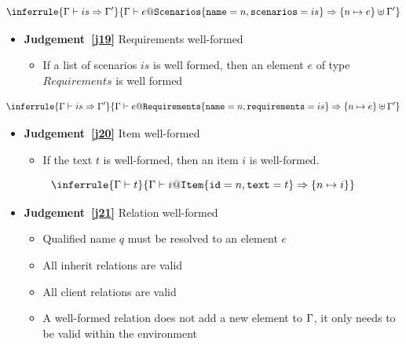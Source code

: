 \documentclass{article}
\begin{document}
\begin{equation}
\label{j18}
\inferrule{
  \wb{\env}{is}{\env'}
}
{
  \wb{\env}{e@\lab{Scenarios}\{\lab{name}=n,\lab{scenarios}=is\}}{\{n\mapsto e\} \uplus \env'}
}
\end{equation}

\begin{itemize}
\item \textbf{Judgement~\ref{j19}} Requirements well-formed
\begin{itemize}
\item If a list of scenarios $is$ is well formed, then an element $e$ of type $Requirements$ is well formed
\end{itemize}
\end{itemize}

\begin{equation}
\label{j19}
\inferrule{
  \wb{\env}{is}{\env'}
}
{
  \wb{\env}{e@\lab{Requirements}\{\lab{name}=n,\lab{requirements}=is\}}{\{n\mapsto e\} \uplus \env'}
}
\end{equation}

\begin{itemize}
\item \textbf{Judgement~\ref{j20}} Item well-formed
\begin{itemize}
\item If the text $t$ is well-formed, then an item $i$ is well-formed.
\end{itemize}
\end{itemize}

\begin{equation}
\label{j20}
\inferrule{
  \wbx{\env}{t}
}{
  \wb{\env}{i@\lab{Item}\{\lab{id}=n,\lab{text}=t\}}{\{n\mapsto i\}}
}
\end{equation}

\begin{itemize}
\item \textbf{Judgement~\ref{j21}} Relation well-formed
\begin{itemize}
\item Qualified name $q$ must be resolved to an element $e$
\item All inherit relations are valid
\item All client relations are valid
\item A well-formed relation does not add a new element to $\Gamma$, it only needs to be valid within the environment
\end{itemize}
\end{itemize}
\end{document}
